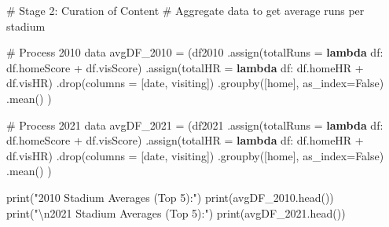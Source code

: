 \documentclass[
  letterpaper,
  DIV=11,
  numbers=noendperiod]{scrartcl}
\newenvironment{Shaded}{\begin{snugshade}}{\end{snugshade}}
\newcommand{\BuiltInTok}[1]{\textcolor[rgb]{0.00,0.23,0.31}{#1}}
\newcommand{\CharTok}[1]{\textcolor[rgb]{0.13,0.47,0.30}{#1}}
\newcommand{\CommentTok}[1]{\textcolor[rgb]{0.37,0.37,0.37}{#1}}
\newcommand{\KeywordTok}[1]{\textcolor[rgb]{0.00,0.23,0.31}{\textbf{#1}}}
\newcommand{\NormalTok}[1]{\textcolor[rgb]{0.00,0.23,0.31}{#1}}
\newcommand{\OperatorTok}[1]{\textcolor[rgb]{0.37,0.37,0.37}{#1}}
\newcommand{\StringTok}[1]{\textcolor[rgb]{0.13,0.47,0.30}{#1}}
\newcommand{\VariableTok}[1]{\textcolor[rgb]{0.07,0.07,0.07}{#1}}
\begin{document}
\label{stage-2-content}
\begin{Shaded}
\begin{Highlighting}[]
\CommentTok{\# Stage 2: Curation of Content}
\CommentTok{\# Aggregate data to get average runs per stadium}

\CommentTok{\# Process 2010 data}
\NormalTok{avgDF\_2010 }\OperatorTok{=}\NormalTok{ (df2010}
\NormalTok{    .assign(totalRuns }\OperatorTok{=} \KeywordTok{lambda}\NormalTok{ df: df.homeScore }\OperatorTok{+}\NormalTok{ df.visScore)}
\NormalTok{    .assign(totalHR }\OperatorTok{=} \KeywordTok{lambda}\NormalTok{ df: df.homeHR }\OperatorTok{+}\NormalTok{ df.visHR)}
\NormalTok{    .drop(columns }\OperatorTok{=}\NormalTok{ [}\StringTok{\textquotesingle{}date\textquotesingle{}}\NormalTok{, }\StringTok{\textquotesingle{}visiting\textquotesingle{}}\NormalTok{])}
\NormalTok{    .groupby([}\StringTok{\textquotesingle{}home\textquotesingle{}}\NormalTok{], as\_index}\OperatorTok{=}\VariableTok{False}\NormalTok{)}
\NormalTok{    .mean()}
\NormalTok{)}

\CommentTok{\# Process 2021 data}
\NormalTok{avgDF\_2021 }\OperatorTok{=}\NormalTok{ (df2021}
\NormalTok{    .assign(totalRuns }\OperatorTok{=} \KeywordTok{lambda}\NormalTok{ df: df.homeScore }\OperatorTok{+}\NormalTok{ df.visScore)}
\NormalTok{    .assign(totalHR }\OperatorTok{=} \KeywordTok{lambda}\NormalTok{ df: df.homeHR }\OperatorTok{+}\NormalTok{ df.visHR)}
\NormalTok{    .drop(columns }\OperatorTok{=}\NormalTok{ [}\StringTok{\textquotesingle{}date\textquotesingle{}}\NormalTok{, }\StringTok{\textquotesingle{}visiting\textquotesingle{}}\NormalTok{])}
\NormalTok{    .groupby([}\StringTok{\textquotesingle{}home\textquotesingle{}}\NormalTok{], as\_index}\OperatorTok{=}\VariableTok{False}\NormalTok{)}
\NormalTok{    .mean()}
\NormalTok{)}

\BuiltInTok{print}\NormalTok{(}\StringTok{"2010 Stadium Averages (Top 5):"}\NormalTok{)}
\BuiltInTok{print}\NormalTok{(avgDF\_2010.head())}
\BuiltInTok{print}\NormalTok{(}\StringTok{"}\CharTok{\textbackslash{}n}\StringTok{2021 Stadium Averages (Top 5):"}\NormalTok{)}
\BuiltInTok{print}\NormalTok{(avgDF\_2021.head())}
\end{Highlighting}
\end{Shaded}
\end{document}
